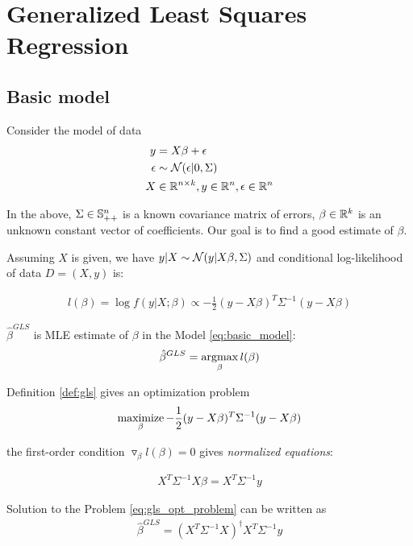 \section{Generalized Least Squares Regression}
\subsection{Basic model}
Consider the model of data
\begin{align}
	\label{eq:basic_model}
	y &= X \beta + \epsilon  \\ 	
	\epsilon &\sim \mathcal{N}(\epsilon| 0, \Sigma) \nonumber \\
	X &\in \mathbb{R}^{n \times k}, y \in \mathbb{R}^n, \epsilon \in \mathbb{R}^n \nonumber 
\end{align}

In the above, $\Sigma \in \mathbb{S}_{++}^n$ is a known covariance matrix of errors, $\beta \in \mathbb{R}^k$ is an unknown constant vector of coefficients.  Our goal is to find a good estimate of $\beta$.

Assuming $X$ is given, we have $y|X \sim \mathcal{N}(y| X\beta, \Sigma)$ and conditional log-likelihood of data $D=(X,y)$ is:


\begin{align*}
	l(\beta) = \log f(y|X; \beta) \propto -\frac{1}{2} (y - X\beta)^T \Sigma^{-1} (y - X \beta)
\end{align*}

\begin{definition}
	\label{def:gls}
	$\hat{\beta}^{GLS}$ is MLE estimate of $\beta$ in the Model \ref{eq:basic_model}: 
	\begin{align}
	\hat{\beta}^{GLS} = \operatorname*{argmax}_\beta  l(\beta)
	\end{align} 
\end{definition}

Definition \autoref{def:gls} gives an optimization problem
\begin{align}
	\label{eq:gls_opt_problem}
	\operatorname*{maximize}_{\beta} -\frac{1}{2} (y - X\beta)^T \Sigma^{-1} (y - X \beta)
\end{align}

the first-order condition $\triangledown_{\beta} l(\beta) = 0$ gives \textit{normalized equations}:

\begin{align*}
	X^T \Sigma^{-1} X \beta = X^T \Sigma^{-1} y 
\end{align*}

Solution to the Problem \ref{eq:gls_opt_problem} can be written as
\begin{align}
	\hat{\beta}^{GLS} = (X^T \Sigma^{-1} X)^{\dagger} X^T \Sigma^{-1} y 
\end{align}

